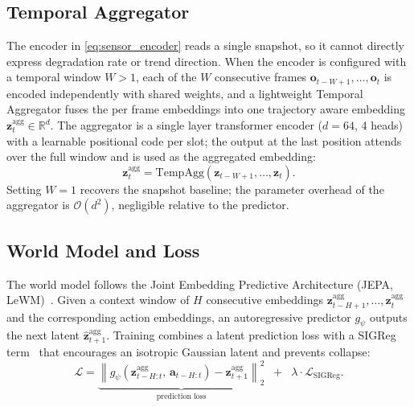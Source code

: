 \subsection{Temporal Aggregator}
\label{app:temporal_agg}

The encoder in \eqref{eq:sensor_encoder} reads a single snapshot, so it
cannot directly express degradation rate or trend direction. When the
encoder is configured with a temporal window $W > 1$, each of the $W$
consecutive frames $\mathbf{o}_{t-W+1}, \ldots, \mathbf{o}_t$ is encoded
independently with shared weights, and a lightweight Temporal
Aggregator fuses the per frame embeddings into one trajectory aware
embedding $\mathbf{z}^\mathrm{agg}_t \in \mathbb{R}^d$. The aggregator
is a single layer transformer encoder ($d{=}64$, 4 heads) with a
learnable positional code per slot; the output at the last position
attends over the full window and is used as the aggregated embedding:
\begin{equation}
  \mathbf{z}^\mathrm{agg}_t = \mathrm{TempAgg}\!\left(
    \mathbf{z}_{t-W+1}, \ldots, \mathbf{z}_t
  \right).
  \label{eq:temporal_agg}
\end{equation}
Setting $W{=}1$ recovers the snapshot baseline; the parameter overhead
of the aggregator is $\mathcal{O}(d^2)$, negligible relative to the
predictor.


\subsection{World Model and Loss}
\label{sec:architecture}

The world model follows the Joint Embedding Predictive Architecture
(JEPA, LeWM)~\citep{Balestriero_LeCun_2025, Maes_Lidec_Scieur_LeCun_Balestriero_2026}.
Given a context window of $H$ consecutive embeddings
$\mathbf{z}^\mathrm{agg}_{t-H+1}, \ldots, \mathbf{z}^\mathrm{agg}_t$ and
the corresponding action embeddings, an autoregressive predictor
$g_\psi$ outputs the next latent
$\hat{\mathbf{z}}^\mathrm{agg}_{t+1}$. Training combines a latent
prediction loss with a SIGReg term~\cite{Balestriero_LeCun_2025} that
encourages an isotropic Gaussian latent and prevents collapse:
\begin{equation}
  \mathcal{L} = \underbrace{
    \left\lVert g_\psi(\mathbf{z}^\mathrm{agg}_{t-H:t},\, \mathbf{a}_{t-H:t})
      - \mathbf{z}^\mathrm{agg}_{t+1} \right\rVert_2^2
  }_{\text{prediction loss}}
  \;\;+\;\;
  \lambda \cdot \mathcal{L}_{\mathrm{SIGReg}}.
  \label{eq:loss}
\end{equation}



